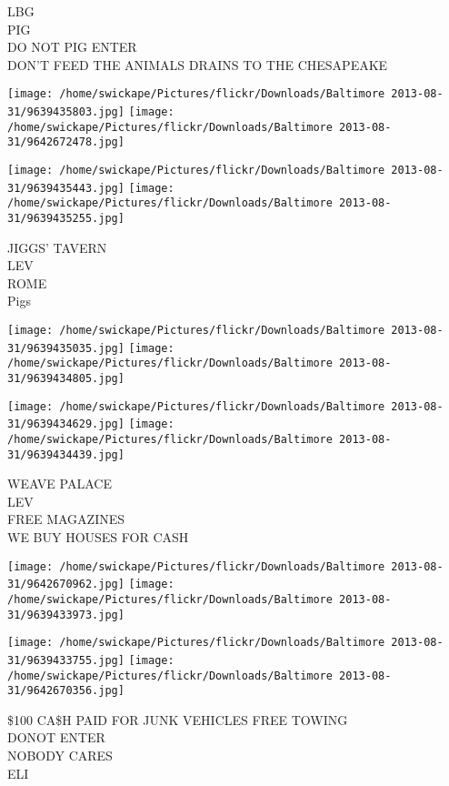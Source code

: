 \documentclass[10pt,letterpaper]{article}
\begin{document}
LBG\\
PIG\\
DO NOT PIG ENTER\\
DON'T FEED THE ANIMALS DRAINS TO THE CHESAPEAKE\\
\pagebreak

\texttt{[image: /home/swickape/Pictures/flickr/Downloads/Baltimore 2013-08-31/9639435803.jpg]}
\texttt{[image: /home/swickape/Pictures/flickr/Downloads/Baltimore 2013-08-31/9642672478.jpg]}

\texttt{[image: /home/swickape/Pictures/flickr/Downloads/Baltimore 2013-08-31/9639435443.jpg]}
\texttt{[image: /home/swickape/Pictures/flickr/Downloads/Baltimore 2013-08-31/9639435255.jpg]}

JIGGS' TAVERN\\
LEV\\
ROME\\
Pigs\\
\pagebreak

\texttt{[image: /home/swickape/Pictures/flickr/Downloads/Baltimore 2013-08-31/9639435035.jpg]}
\texttt{[image: /home/swickape/Pictures/flickr/Downloads/Baltimore 2013-08-31/9639434805.jpg]}

\texttt{[image: /home/swickape/Pictures/flickr/Downloads/Baltimore 2013-08-31/9639434629.jpg]}
\texttt{[image: /home/swickape/Pictures/flickr/Downloads/Baltimore 2013-08-31/9639434439.jpg]}

WEAVE PALACE\\
LEV\\
FREE MAGAZINES\\
WE BUY HOUSES FOR CASH\\
\pagebreak

\texttt{[image: /home/swickape/Pictures/flickr/Downloads/Baltimore 2013-08-31/9642670962.jpg]}
\texttt{[image: /home/swickape/Pictures/flickr/Downloads/Baltimore 2013-08-31/9639433973.jpg]}

\texttt{[image: /home/swickape/Pictures/flickr/Downloads/Baltimore 2013-08-31/9639433755.jpg]}
\texttt{[image: /home/swickape/Pictures/flickr/Downloads/Baltimore 2013-08-31/9642670356.jpg]}

\$100 CA\$H PAID FOR JUNK VEHICLES FREE TOWING\\
DONOT ENTER\\
NOBODY CARES\\
ELI\\
\pagebreak
\end{document}
